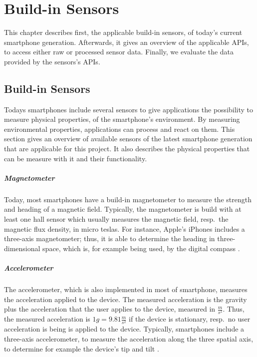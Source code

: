 \chapter{Build-in Sensors} \label{chap:sensors}

This chapter describes first, the applicable build-in sensors, of today's current smartphone generation. Afterwards, it gives an overview of the applicable \acsp{API}, to access either raw or processed sensor data. Finally, we evaluate the data provided by the sensors's \acsp{API}.


\section{Build-in Sensors}
Todays smartphones include several sensors to give applications the possibility to measure physical properties, of the smartphone's environment. By measuring environmental properties, applications can process and react on them. This section gives an overview of available sensors of the latest smartphone generation that are applicable for this project. It also describes the physical properties that can be measure with it and their functionality.

\paragraph{Magnetometer}
Today, most smartphones have a build-in magnetometer to measure the strength and heading of a magnetic field. Typically, the magnetometer is build with at least one hall sensor which usually measures the magnetic field, resp.\ the magnetic flux density, in micro teslas. For instance, Apple's iPhones includes a three-axis magnetometer; thus, it is able to determine the heading in three-dimensional space, which is, for example being used, by the digital compass \citep{apple:wwdc_2012_pham,apple:ios_doc_cm}.


\paragraph{Accelerometer}
The accelerometer, which is also implemented in most of smartphone, measures the acceleration applied to the device. The measured acceleration is the gravity plus the acceleration that the user applies to the device, measured in $\frac{m}{s^2}$. Thus, the measured acceleration is $1g = 9.81 \frac{m}{s^2}$ if the device is stationary, resp.\ no user acceleration is being is applied to the device. Typically, smartphones include a three-axis accelerometer, to measure the acceleration along the three spatial axis, to determine for example the device's tip and tilt \citep{apple:wwdc_2012_pham,apple:ios_doc_cm}.

